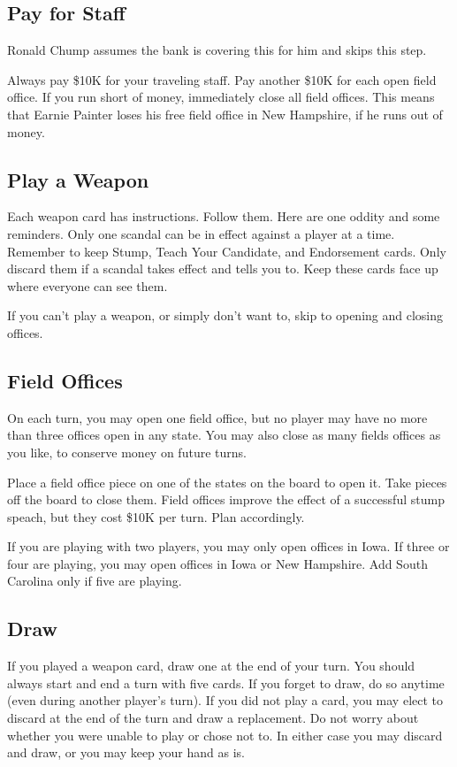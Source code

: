 \documentclass[twocolumn]{article}
\begin{document}
\subsection{Pay for Staff}
Ronald Chump assumes the bank is covering this for him and skips this step.

Always pay \$10K for your traveling staff. Pay another \$10K for each open field office. If you run short of money, immediately close all field offices. This
means that Earnie Painter loses his free field office in New Hampshire, if he runs out of money.

\subsection{Play a Weapon}
Each weapon card has instructions. Follow them. Here are one oddity and some reminders. Only one scandal can be in effect against a player at a time.
Remember to keep Stump, Teach Your Candidate, and Endorsement cards. Only discard them if a scandal takes effect and tells you to. Keep these cards face up
where everyone can see them.

If you can't play a weapon, or simply don't want to, skip to opening and closing offices.

\subsection{Field Offices}
On each turn, you may open one field office, but no player may have no more than three offices open in any state.
You may also close as many fields offices as you like, to conserve money on future turns.

Place a field office piece on one of the states on the board to open it. Take pieces off the board to close them. Field offices improve the effect of a
successful stump speach, but they cost \$10K per turn. Plan accordingly.

If you are playing with two players, you may only open offices in Iowa. If three or four are playing, you may open offices in Iowa or New Hampshire. Add
South Carolina only if five are playing.

\subsection{Draw}
If you played a weapon card, draw one at the end of your turn. You should always start and end a turn with five cards. If you forget to draw, do so
anytime (even during another player's turn). If you did not play a card, you may elect to discard at the end of the turn and draw a replacement. Do not
worry about whether you were unable to play or chose not to. In either case you may discard and draw, or you may keep your hand as is.
\end{document}
